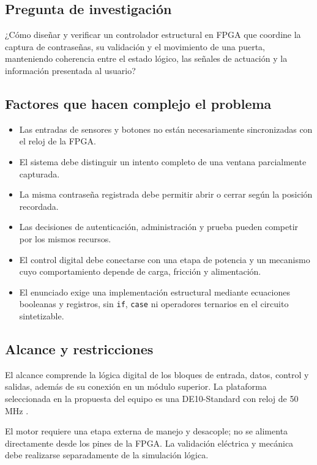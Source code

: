 \documentclass[12pt,letterpaper]{article}
\begin{document}
\subsection{Pregunta de investigación}

¿Cómo diseñar y verificar un controlador estructural en
FPGA que coordine la captura de contraseñas, su validación
y el movimiento de una puerta, manteniendo coherencia
entre el estado lógico, las señales de actuación y la
información presentada al usuario?

\subsection{Factores que hacen complejo el problema}

\begin{itemize}
    \item Las entradas de sensores y botones no están
    necesariamente sincronizadas con el reloj de la FPGA.
    \item El sistema debe distinguir un intento completo
    de una ventana parcialmente capturada.
    \item La misma contraseña registrada debe permitir
    abrir o cerrar según la posición recordada.
    \item Las decisiones de autenticación, administración
    y prueba pueden competir por los mismos recursos.
    \item El control digital debe conectarse con una etapa
    de potencia y un mecanismo cuyo comportamiento depende
    de carga, fricción y alimentación.
    \item El enunciado exige una implementación estructural
    mediante ecuaciones booleanas y registros, sin
    \texttt{if}, \texttt{case} ni operadores ternarios en
    el circuito sintetizable.
\end{itemize}

\subsection{Alcance y restricciones}

El alcance comprende la lógica digital de los bloques de
entrada, datos, control y salidas, además de su conexión
en un módulo superior. La plataforma seleccionada en la
propuesta del equipo es una DE10-Standard con reloj de
50 MHz \cite{propuesta}.

El motor requiere una etapa externa de manejo y desacople;
no se alimenta directamente desde los pines de la FPGA.
La validación eléctrica y mecánica debe realizarse
separadamente de la simulación lógica.
\end{document}
